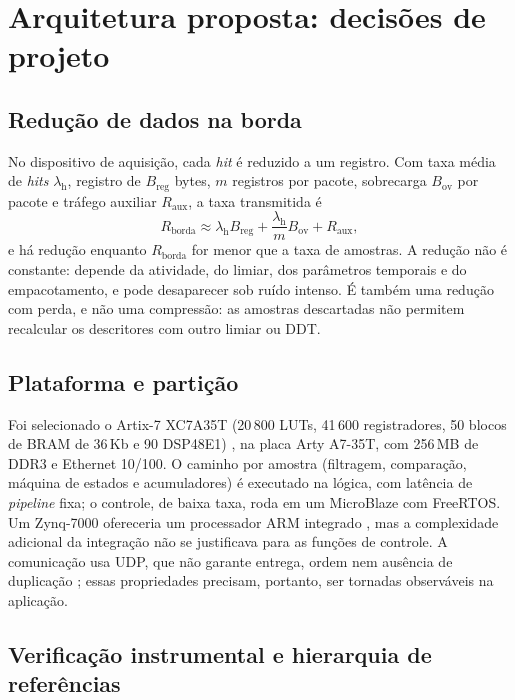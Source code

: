 \section{Arquitetura proposta: decisões de projeto}
\label{sec:mm_decisoes}

\subsection{Redução de dados na borda}
\label{subsec:reducao_borda}

No dispositivo de aquisição, cada \textit{hit} é reduzido a um registro. Com taxa média de \textit{hits} \(\lambda_{\mathrm{h}}\), registro de \(B_{\mathrm{reg}}\) bytes, \(m\) registros por pacote, sobrecarga \(B_{\mathrm{ov}}\) por pacote e tráfego auxiliar \(R_{\mathrm{aux}}\), a taxa transmitida é
\begin{equation}
	R_{\mathrm{borda}} \approx \lambda_{\mathrm{h}}B_{\mathrm{reg}} + \frac{\lambda_{\mathrm{h}}}{m}B_{\mathrm{ov}} + R_{\mathrm{aux}},
	\label{eq:taxa_borda}
\end{equation}
e há redução enquanto \(R_{\mathrm{borda}}\) for menor que a taxa de amostras. A redução não é constante: depende da atividade, do limiar, dos parâmetros temporais e do empacotamento, e pode desaparecer sob ruído intenso. É também uma redução com perda, e não uma compressão: as amostras descartadas não permitem recalcular os descritores com outro limiar ou DDT.

\subsection{Plataforma e partição}
\label{subsec:plataforma}

Foi selecionado o Artix-7 XC7A35T (20\,800 LUTs, 41\,600 registradores, 50 blocos de BRAM de 36\,Kb e 90 DSP48E1) \cite{xilinx2020ds180}, na placa Arty A7-35T, com 256\,MB de DDR3 e Ethernet 10/100. O caminho por amostra (filtragem, comparação, máquina de estados e acumuladores) é executado na lógica, com latência de \textit{pipeline} fixa; o controle, de baixa taxa, roda em um MicroBlaze com FreeRTOS. Um Zynq-7000 ofereceria um processador ARM integrado \cite{xilinx2018ds190}, mas a complexidade adicional da integração não se justificava para as funções de controle. A comunicação usa UDP, que não garante entrega, ordem nem ausência de duplicação \cite{postel1980udp}; essas propriedades precisam, portanto, ser tornadas observáveis na aplicação.

\subsection{Verificação instrumental e hierarquia de referências}
\label{subsec:metodologia_validacao}
\label{v2:subsec:sistema_referencia_experimento}

